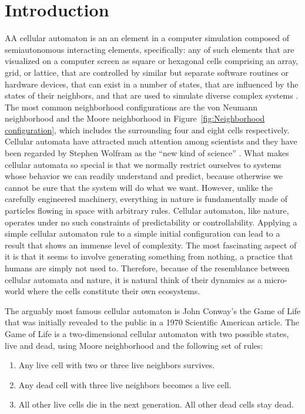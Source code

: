 \documentclass[12pt]{article}
\numberwithin{figure}{section} %
\begin{document}
\newpage
\thispagestyle{plain}
\listoffigures
\newpage
\thispagestyle{plain}
\listoftables
\newpage
\thispagestyle{plain}
\tableofcontents
\thispagestyle{plain}

\pagestyle{fancy}
\fancyhf{}
\rhead{\thepage}
\renewcommand{\headrulewidth}{0.4pt}
\newpage
\section{Introduction}
\label{Introduction}
AA cellular automaton is an an element in a computer simulation composed of semiautonomous interacting elements, specifically: any of such elements that are visualized on a computer screen as square or hexagonal cells comprising an array, grid, or lattice, that are controlled by similar but separate software routines or hardware devices, that can exist in a number of states, that are influenced by the states of their neighbors, and that are used to simulate diverse complex systems \cite{MW}. The most common neighborhood configurations are the von Neumann neighborhood and the Moore neighborhood in Figure~\ref{fig:Neighborhood configuration}, which includes the surrounding four and eight cells respectively. Cellular automata have attracted much attention among scientists and they have been regarded by Stephen Wolfram as the “new kind of science” \cite{A new kind of Science}. What makes cellular automata so special is that we normally restrict ourselves to systems whose behavior we can readily understand and predict, because otherwise we cannot be sure that the system will do what we want. However, unlike the carefully engineered machinery, everything in nature is fundamentally made of particles flowing in space with arbitrary rules. Cellular automaton, like nature, operates under no such constraints of predictability or controllability. Applying a simple cellular automaton rule to a simple initial configuration can lead to a result that shows an immense level of complexity. The most fascinating aspect of it is that it seems to involve generating something from nothing, a practice that humans are simply not used to. Therefore, because of the resemblance between cellular automata and nature, it is natural think of their dynamics as a micro-world where the cells constitute their own ecosystems. 

The arguably most famous cellular automaton is John Conway’s the Game of Life \cite{The Game of Life} that was initially revealed to the public in a 1970 Scientific American article. The Game of Life is a two-dimensional cellular automaton with two possible states, live and dead, using Moore neighborhood and the following set of rules: 
\begin{enumerate}[topsep=0pt,itemsep=-1ex,partopsep=1ex,parsep=1ex]
\item Any live cell with two or three live neighbors survives. 
\item Any dead cell with three live neighbors becomes a live cell. 
\item All other live cells die in the next generation. All other dead cells stay dead. 
\end{enumerate}
\end{document}
